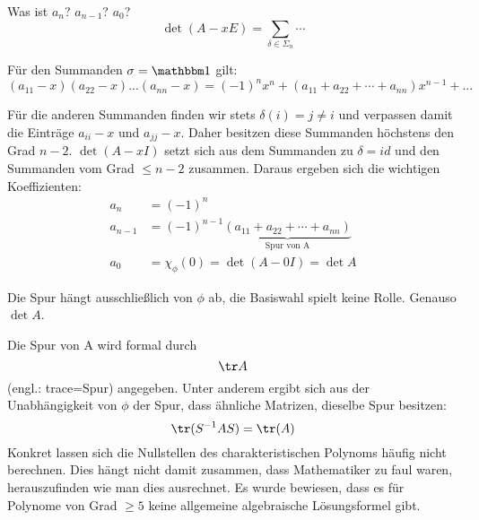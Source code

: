 \documentclass{mycourse}
\begin{document}
Was ist $a_n$? $a_{n-1}$? $a_0$?
\fixme
\[
\det(A-xE)=\sum_{\delta \in \Sigma_n} \cdots
\]

Für den Summanden $\sigma=\Eins$ gilt:
 \[
 (a_{11}-x)(a_{22}-x)...(a_{nn}-x)=(-1)^nx^n+(a_{11}+a_{22}+\cdots+a_{nn})x^{n-1}+...
 \]

Für die anderen Summanden finden wir stets $\delta(i)=j\neq i$  und verpassen damit die Einträge $a_{ii}-x$ und $a_{jj}-x$.  Daher  besitzen diese Summanden höchstens den Grad $n-2$. $\det(A-xI)$ setzt sich aus dem Summanden zu $\delta=id$ und den Summanden vom Grad $\leq n-2$ zusammen.  Daraus ergeben sich die wichtigen Koeffizienten:
\begin{align*}
a_n&=(-1)^n \\
a_{n-1}&=(-1)^{n-1} \underbrace{(a_{11}+a_{22}+\cdots+a_{nn})}_{\text{Spur von A}} \\
a_0&=\chi_\phi(0)=\det(A-0I)=\det A
\end{align*}

\begin{note}
Die Spur hängt ausschließlich von $\phi$ ab, die Basiswahl spielt keine Rolle.
Genauso $\det A$.
\end{note}
\begin{note}
Die Spur von A wird formal durch 
\[
	\tr A
\]
(engl.: trace=Spur) angegeben. 
Unter anderem ergibt sich aus der Unabhängigkeit von $\phi$ der Spur, dass ähnliche Matrizen, dieselbe Spur besitzen:  
\[
	\tr (S^{-1}AS)= \tr (A)
\]
Konkret lassen sich die Nullstellen des charakteristischen Polynoms häufig nicht berechnen.  
Dies hängt nicht damit zusammen, dass Mathematiker zu faul waren, herauszufinden wie man dies ausrechnet. 
Es wurde bewiesen, dass es für Polynome von Grad $\ge 5$ keine allgemeine algebraische Lösungsformel gibt.
\end{note}
\end{document}
